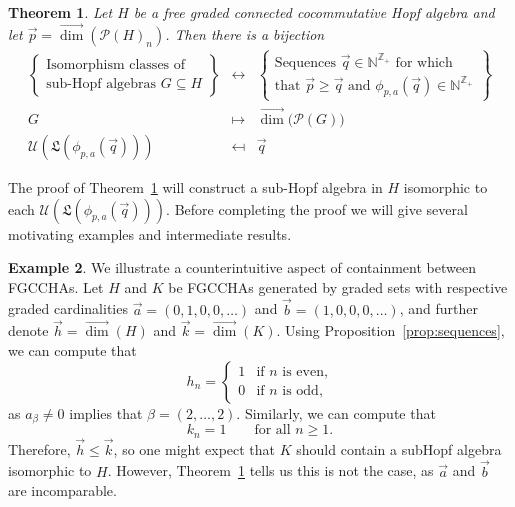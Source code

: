 \documentclass[11pt]{amsart}
\newtheorem{theorem}{Theorem}[section]
\theoremstyle{definition}
\newtheorem{example}[theorem]{Example}
\numberwithin{equation}{section}
\def\NN{{\mathbb N}}
\def\ZZ{{\mathbb Z}}
\newcommand{\FGCCHAs}{\textsf{FGCCHA}s\xspace}
\newcommand{\vecdim}{\overrightarrow{\dim}}
\begin{document}
\begin{theorem}
\label{thm:subclassification2}
Let $H$ be a free graded connected cocommutative Hopf algebra and let $\vec{p} = \vecdim(\mathcal{P}(H)_{n})$.  Then there is a bijection
\[
\begin{array}{rcl}
\left\{\begin{array}{c}
\text{Isomorphism classes of} \\
\text{sub-Hopf algebras $G \subseteq H$}
\end{array}\right\}
& \leftrightarrow & 
\left\{\begin{array}{c}
\text{Sequences $\vec{q} \in \NN^{\ZZ_{+}}$ for which } \\
\text{that $\vec{p} \ge \vec{q}$ and $\phi_{p, a}(\vec{q}) \in \NN^{\ZZ_{+}}$} 
\end{array}\right\} \\[2em]
G & \mapsto & \vecdim\big(\mathcal{P}(G)\big) \\
\mathcal{U}(\mathfrak{L}(\phi_{p, a}(\vec{q}))) & \mapsfrom & \vec{q}
\end{array}
\]
\end{theorem}

The proof of Theorem~\ref{thm:subclassification2} will construct a sub-Hopf algebra in $H$ isomorphic to each $\mathcal{U}(\mathfrak{L}(\phi_{p, a}(\vec{q})))$.  
Before completing the proof we will give several motivating examples and intermediate results.

\begin{example}
We illustrate a counterintuitive aspect of containment between \FGCCHAs. Let $H$ and $K$ be \FGCCHAs generated by graded sets with respective graded cardinalities $\vec{a}=(0,1,0,0,\dots)$ and $\vec{b}=(1,0,0,0,\dots)$, and further denote $\vec{h} = \vecdim(H)$ and $\vec{k} = \vecdim(K)$.
Using Proposition~\ref{prop:sequences}, we can compute that
\[
h_n = \begin{cases} 1 & \text{if $n$ is even,} \\ 0 & \text{if $n$ is odd,} \end{cases}
\]
as $a_{\beta} \neq 0$ implies that $\beta = (2, \ldots, 2)$.  Similarly, we can compute that
\[
k_{n} = 1 \qquad\text{for all $n \ge 1$}.
\]
Therefore, $\vec{h} \le \vec{k}$, so one might expect that $K$ should contain a subHopf algebra isomorphic to $H$.  However, Theorem~\ref{thm:subclassification2} tells us this is not the case, as $\vec{a}$ and $\vec{b}$ are incomparable.
\end{example}
\end{document}
